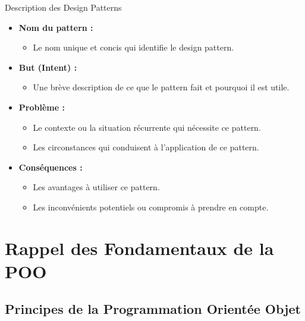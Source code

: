 \documentclass[aspectratio=169]{beamer}
\begin{document}
\begin{frame}{Description des Design Patterns}
    \begin{itemize}
        \item \textbf{Nom du pattern :}
        \begin{itemize}
            \item Le nom unique et concis qui identifie le design pattern.
        \end{itemize}

        \item \textbf{But (Intent) :}
        \begin{itemize}
            \item Une brève description de ce que le pattern fait et pourquoi il est utile.
        \end{itemize}

        \item \textbf{Problème :}
        \begin{itemize}
            \item Le contexte ou la situation récurrente qui nécessite ce pattern.
            \item Les circonstances qui conduisent à l'application de ce pattern.
        \end{itemize}

        \item \textbf{Conséquences :}
        \begin{itemize}
            \item Les avantages à utiliser ce pattern.
            \item Les inconvénients potentiels ou compromis à prendre en compte.
        \end{itemize}
    \end{itemize}
\end{frame}

\section{Rappel des Fondamentaux de la POO}

\subsection{Principes de la Programmation Orientée Objet}
\end{document}
